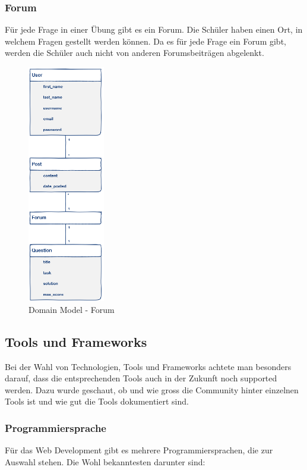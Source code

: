 \newpage
\subsubsection*{Forum}
Für jede Frage in einer Übung gibt es ein Forum. Die Schüler haben einen Ort, in welchem Fragen gestellt werden können. Da es für jede Frage ein Forum gibt, werden die Schüler auch nicht von anderen Forumsbeiträgen abgelenkt.
\begin{figure}[H]
\begin{center}
	\includegraphics[width=0.3\textwidth, keepaspectratio]{images/domain_model_forum.png}
	\caption{Domain Model - Forum}
	\label{fig:domain_model_forum}
\end{center}
\end{figure}


\subsection{Tools und Frameworks}
Bei der Wahl von Technologien, Tools und Frameworks achtete man besonders darauf, dass die entsprechenden Tools auch in der Zukunft noch supported werden. Dazu wurde geschaut, ob und wie gross die Community hinter einzelnen Tools ist und wie gut die Tools dokumentiert sind.

\subsubsection*{Programmiersprache}
Für das Web Development gibt es mehrere Programmiersprachen, die zur Auswahl stehen. Die Wohl bekanntesten darunter sind:

